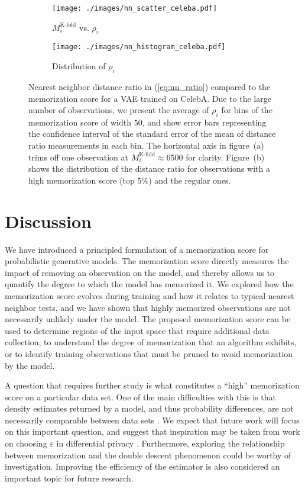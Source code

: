 \documentclass{article}
\begin{document}
\begin{figure}[tb]
	\centering
	\captionsetup[subfigure]{justification=centering}%
	\begin{subfigure}[b]{.40\textwidth}
		\texttt{[image: ./images/nn\_scatter\_celeba.pdf]}
		\caption{$M^{\text{K-fold}}_i$ vs. $\rho_i$ 
			\label{fig:nn_vs_mem_scatter}}
	\end{subfigure}
	\qquad
	\qquad
	\begin{subfigure}[b]{.40\textwidth}
		\texttt{[image: ./images/nn\_histogram\_celeba.pdf]}
		\caption{Distribution of $\rho_i$ \label{fig:nn_vs_mem_hist}}
	\end{subfigure}
	\caption{Nearest neighbor distance ratio in (\ref{eq:nn_ratio}) 
		compared to the memorization score for a VAE trained on 
		CelebA. Due to the large number of observations, we present 
		the average of $\rho_i$ for bins of the memorization score of 
		width $50$, and show error bars representing the confidence 
		interval of the standard error of the mean of distance ratio 
		measurements in each bin. The horizontal axis in figure~(a) 
		trims off one observation at $M^{\text{K-fold}}_i \approx 
		6500$ for clarity. Figure~(b) shows the distribution of the 
		distance ratio for observations with a high memorization score 
		(top 5\%) and the regular ones.}%
	\label{fig:nn_vs_mem}
\end{figure}


\section{Discussion}
\label{sec:discussion}

We have introduced a principled formulation of a memorization score for 
probabilistic generative models. The memorization score directly measures the 
impact of removing an observation on the model, and thereby allows us to 
quantify the degree to which the model has memorized it. We explored how the 
memorization score evolves during training and how it relates to typical 
nearest neighbor tests, and we have shown that highly memorized observations 
are not necessarily unlikely under the model. The proposed memorization score 
can be used to determine regions of the input space that require additional 
data collection, to understand the degree of memorization that an algorithm 
exhibits, or to identify training observations that must be pruned to avoid 
memorization by the model.

A question that requires further study is what constitutes a ``high'' 
memorization score on a particular data set. One of the main difficulties with 
this is that density estimates returned by a model, and thus probability 
differences, are not necessarily comparable between data sets 
\cite{nalisnick2019deep}. We expect that future work will focus on this 
important question, and suggest that inspiration may be taken from work on 
choosing $\varepsilon$ in differential privacy 
\cite{lee2011much,hsu2014differential}. Furthermore, exploring the 
relationship between memorization and the double descent phenomenon 
\cite{belkin2019reconciling,nakkiran2020deep} could be worthy of 
investigation. Improving the efficiency of the estimator is also considered an 
important topic for future research.
\end{document}
